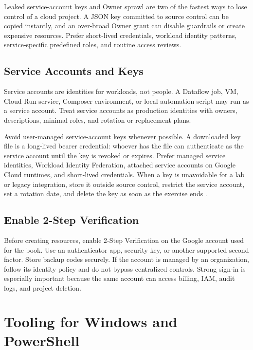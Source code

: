 \begin{pitfall}
Leaked service-account keys and Owner sprawl are two of the fastest ways to lose control of a cloud project. A JSON key committed to source control can be copied instantly, and an over-broad Owner grant can disable guardrails or create expensive resources. Prefer short-lived credentials, workload identity patterns, service-specific predefined roles, and routine access reviews.
\end{pitfall}

\subsection{Service Accounts and Keys}
Service accounts are identities for workloads, not people. A Dataflow job, VM, Cloud Run service, Composer environment, or local automation script may run as a service account. Treat service accounts as production identities with owners, descriptions, minimal roles, and rotation or replacement plans.

Avoid user-managed service-account keys whenever possible. A downloaded key file is a long-lived bearer credential: whoever has the file can authenticate as the service account until the key is revoked or expires. Prefer managed service identities, Workload Identity Federation, attached service accounts on Google Cloud runtimes, and short-lived credentials. When a key is unavoidable for a lab or legacy integration, store it outside source control, restrict the service account, set a rotation date, and delete the key as soon as the exercise ends \cite{googlecloudiamoverview}.

\subsection{Enable 2-Step Verification}
Before creating resources, enable 2-Step Verification on the Google account used for the book. Use an authenticator app, security key, or another supported second factor. Store backup codes securely. If the account is managed by an organization, follow its identity policy and do not bypass centralized controls. Strong sign-in is especially important because the same account can access billing, IAM, audit logs, and project deletion.

\section{Tooling for Windows and PowerShell}

